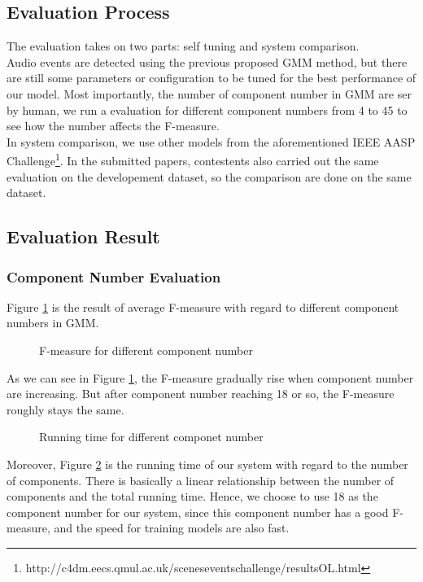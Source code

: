 \subsection{Evaluation Process}
The evaluation takes on two parts: self tuning and system comparison. \\ 

Audio events are detected using the previous proposed GMM method, but there are still some parameters or configuration to be tuned for the best performance of our model.
Most importantly, the number of component number in GMM are ser by human, we run a evaluation for different component numbers from 4 to 45 to see how the number affects the F-measure. \\ 

In system comparison, we use other models from the aforementioned IEEE AASP Challenge\footnote{http://c4dm.eecs.qmul.ac.uk/sceneseventschallenge/resultsOL.html}. 
In the submitted papers, contestents also carried out the same evaluation on the developement dataset, so the comparison are done on the same dataset.  

\subsection{Evaluation Result}
\subsubsection{Component Number Evaluation}
Figure \ref{fig:component} is the result of average F-measure with regard to different component numbers in GMM. 
\begin{figure}[htb]
\centering

\caption{F-measure for different component number}
\label{fig:component}
\end{figure}

As we can see in Figure \ref{fig:component}, the F-measure gradually rise when component number are increasing. 
But after component number reaching 18 or so, the F-measure roughly stays the same. \\ 

\begin{figure}[htb]
\centering

\caption{Running time for different componet number}
\label{fig:componentTime}
\end{figure}
Moreover, Figure \ref{fig:componentTime} is the running time of our system with regard to the number of components. 
There is basically a linear relationship between the number of components and the total running time. 
Hence, we choose to use 18 as the component number for our system, since this component number has a good F-measure, and the speed for training models are also fast.\\ 

